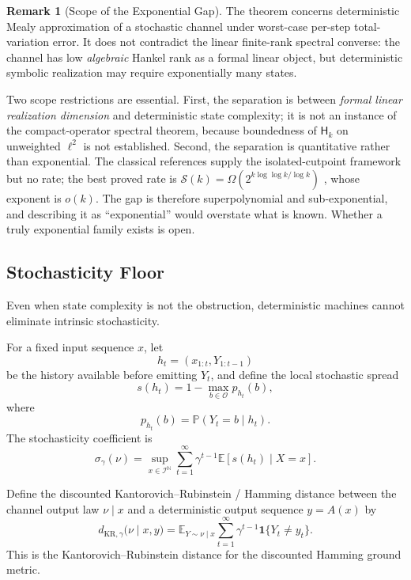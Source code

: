 \documentclass[12pt]{article}
\theoremstyle{definition}
\newtheorem{remark}[theorem]{Remark}
\begin{document}
\begin{remark}[Scope of the Exponential Gap]
\label{rem:exp-gap-scope}
The theorem concerns deterministic Mealy approximation of a stochastic channel
under worst-case per-step total-variation error.  It does not contradict the
linear finite-rank spectral converse: the channel has low \emph{algebraic}
Hankel rank as a formal linear object, but deterministic symbolic realization
may require exponentially many states.

Two scope restrictions are essential.  First, the separation is between
\emph{formal linear realization dimension} and deterministic state complexity;
it is not an instance of the compact-operator spectral theorem, because
boundedness of $\mathsf H_k$ on unweighted $\ell^2$ is not established.
Second, the separation is quantitative rather than exponential.  The classical
references \cite{rabin1963,freivalds1981} supply the isolated-cutpoint
framework but no rate; the best proved rate is
$\mathcal S(k)=\Omega(2^{k\log\log k/\log k})$ \cite{ambainis1996}, whose
exponent is $o(k)$.  The gap is therefore superpolynomial and sub-exponential,
and describing it as ``exponential'' would overstate what is known.  Whether a
truly exponential family exists is open.
\end{remark}

\subsection{Stochasticity Floor}
\label{subsec:stochasticity-floor}

Even when state complexity is not the obstruction, deterministic machines
cannot eliminate intrinsic stochasticity.

For a fixed input sequence $x$, let
\[
h_t=(x_{1:t},Y_{1:t-1})
\]
be the history available before emitting $Y_t$, and define the local
stochastic spread
\[
s(h_t)
=
1-\max_{b\in\mathcal O}p_{h_t}(b),
\]
where
\[
p_{h_t}(b)
=
\mathbb P(Y_t=b\mid h_t).
\]
The stochasticity coefficient is
\[
\sigma_\gamma(\nu)
=
\sup_{x\in\mathcal I^{\mathbb N}}
\sum_{t=1}^\infty
\gamma^{t-1}
\mathbb E[s(h_t)\mid X=x].
\]

Define the discounted Kantorovich--Rubinstein / Hamming distance between the
channel output law $\nu\mid x$ and a deterministic output sequence
$y=A(x)$ by
\[
d_{\mathrm{KR},\gamma}
\bigl(
\nu\mid x,y
\bigr)
=
\mathbb E_{Y\sim\nu\mid x}
\sum_{t=1}^\infty
\gamma^{t-1}
\mathbf 1\{Y_t\neq y_t\}.
\]
This is the Kantorovich--Rubinstein distance for the discounted Hamming ground
metric.
\end{document}
